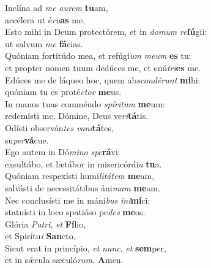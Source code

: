 \evenverse Inclína ad \textit{me} \textit{au}\textit{rem} \textbf{tu}am,~\*\\
\evenverse accélera ut é\textit{ru}\textbf{as} me.\\
\oddverse Esto mihi in Deum protectórem, et in \textit{do}\textit{mum} \textit{re}\textbf{fú}gii:~\*\\
\oddverse ut salvum \textit{me} \textbf{fá}cias.\\
\evenverse Quóniam fortitúdo mea, et refúgi\textit{um} \textit{me}\textit{um} \textbf{es} tu:~\*\\
\evenverse et propter nomen tuum dedúces me, et enú\textit{tri}\textbf{es} me.\\
\oddverse Edúces me de láqueo hoc, quem ab\textit{scon}\textit{dé}\textit{runt} \textbf{mi}hi:~\*\\
\oddverse quóniam tu es proté\textit{ctor} \textbf{me}us.\\
\evenverse In manus tuas comméndo \textit{spí}\textit{ri}\textit{tum} \textbf{me}um:~\*\\
\evenverse redemísti me, Dómine, Deus ve\textit{ri}\textbf{tá}tis.\\
\oddverse Odísti observán\textit{tes} \textit{va}\textit{ni}\textbf{tá}tes,~\*\\
\oddverse su\textit{per}\textbf{vá}cue.\\
\evenverse Ego autem in Dó\textit{mi}\textit{no} \textit{spe}\textbf{rá}vi:~\*\\
\evenverse exsultábo, et lætábor in misericórdi\textit{a} \textbf{tu}a.\\
\oddverse Quóniam respexísti humi\textit{li}\textit{tá}\textit{tem} \textbf{me}am,~\*\\
\oddverse salvásti de necessitátibus áni\textit{mam} \textbf{me}am.\\
\evenverse Nec conclusísti me in máni\textit{bus} \textit{i}\textit{ni}\textbf{mí}ci:~\*\\
\evenverse statuísti in loco spatióso pe\textit{des} \textbf{me}os.\\
\oddverse Glória \textit{Pa}\textit{tri}, \textit{et} \textbf{Fí}lio,~\*\\
\oddverse et Spirítu\textit{i} \textbf{San}cto.\\
\evenverse Sicut erat in princípio, \textit{et} \textit{nunc}, \textit{et} \textbf{sem}per,~\*\\
\evenverse et in sǽcula sæculó\textit{rum}. \textbf{A}men.\\
